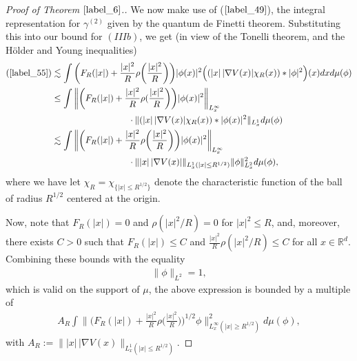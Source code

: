 \documentclass[reqno]{amsart}
\numberwithin{equation}{section}
\theoremstyle{remark}
\begin{document}
\begin{proof}[Proof of Theorem $\ref{label_6}$.]
We now make use of ($\ref{label_49}$), the integral representation for $\gamma^{(2)}$ given by the quantum de Finetti theorem.  Substituting this into our bound for $(IIIb)$, we get (in view of the Tonelli theorem, and the H\"older and Young inequalities)
\begin{align*}
(\ref{label_55})&\lesssim \int \bigg(F_R(|x|)+\frac{|x|^2}{R}\rho\bigg(\frac{|x|^2}{R}\bigg)\bigg)|\phi(x)|^2\Big((|x|\,|\nabla V(x)|\chi_{R}(x)) \ast |\phi|^2\Big)(x)dxd\mu(\phi)\\
&\leq \int \bigg\lVert \bigg(F_R(|x|)+\frac{|x|^2}{R}\rho(\frac{|x|^2}{R}\bigg)\bigg)|\phi(x)|^2\bigg\rVert_{L_x^\infty}\\
&\hspace{1.2in} \cdot\lVert (|x|\,|\nabla V(x)|\chi_R(x))\ast |\phi(x)|^2\rVert_{L_x^1}d\mu(\phi)\\
&\lesssim \int \bigg\lVert \bigg(F_R(|x|)+\frac{|x|^2}{R}\rho\bigg(\frac{|x|^2}{R}\bigg)\bigg)|\phi(x)|^2\bigg\rVert_{L_x^\infty}\\
&\hspace{1.2in} \cdot \lVert |x|\,|\nabla V(x)|\rVert_{L_x^1(|x|\leq R^{1/2})}\lVert \phi\rVert_{L_x^2}^2d\mu(\phi),
\end{align*}
where we have let $\chi_{R}=\chi_{\{|x|\leq R^{1/2}\}}$ denote the characteristic function of the ball of radius $R^{1/2}$ centered at the origin.

Now, note that $F_R(|x|)=0$ and $\rho(|x|^2/R)=0$ for $|x|^2\leq R$, and, moreover, there exists $C>0$ such that $F_R(|x|)\leq C$ and $\frac{|x|^2}{R}\rho(|x|^2/R)\leq C$ for all $x\in\mathbb{R}^d$.  Combining these bounds with the equality 
\begin{align}
\lVert \phi\rVert_{L^2}=1,\label{label_56}
\end{align}
which is valid on the support of $\mu$, the above expression is bounded by a multiple of
\begin{align}
A_R\int \bigg\lVert \bigg(F_R(|x|)+\frac{|x|^2}{R}\rho\bigg(\frac{|x|^2}{R}\bigg)\bigg)^{1/2}\phi\bigg\rVert_{L_x^\infty(|x|\geq R^{1/2})}^2 d\mu(\phi),\label{label_57}
\end{align}
with $A_R:=\lVert |x|\, |\nabla V(x)\rVert_{L_x^1(|x|\leq R^{1/2})}$.


\end{proof}
\end{document}

